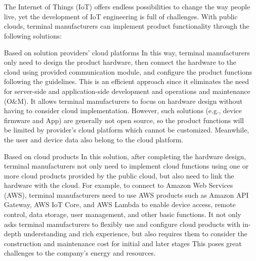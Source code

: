 \documentclass[a4paper,12pt]{book}
\begin{document}

\chapter[Introduction to ESP RainMaker]{}

\vspace{36pt}
The Internet of Things (IoT) offers endless possibilities to change the way people live, yet the development of IoT engineering is full of challenges. With public clouds, terminal manufacturers can implement product functionality through the following solutions:

\begin{term}{Based on solution providers’ cloud platforms}
    In this way, terminal manufacturers only need to design the product hardware, then connect the hardware to the cloud using provided communication module, and configure the product functions following the guidelines. This is an efficient approach since it eliminates the need for server-side and application-side development and operations and maintenance (O\&M). It allows terminal manufacturers to focus on hardware design without having to consider cloud implementation. However, such solutions (e.g., device firmware and App) are generally not open source, so the product functions will be limited by provider’s cloud platform which cannot be customized. Meanwhile, the user and device data also belong to the cloud platform.
\end{term}

\begin{term}{Based on cloud products}
    In this solution, after completing the hardware design, terminal manufacturers not only need to implement cloud functions using one or more cloud products provided by the public cloud, but also need to link the hardware with the cloud. For example, to connect to Amazon Web Services (AWS), terminal manufacturers need to use AWS products such as Amazon API Gateway, AWS IoT Core, and AWS Lambda to enable device access, remote control, data storage, user management, and other basic functions. It not only asks terminal manufacturers to flexibly use and configure cloud products with in-depth understanding and rich experience, but also requires them to consider the construction and maintenance cost for initial and later stages This poses great challenges to the company's energy and resources.
\end{term}
\end{document}
